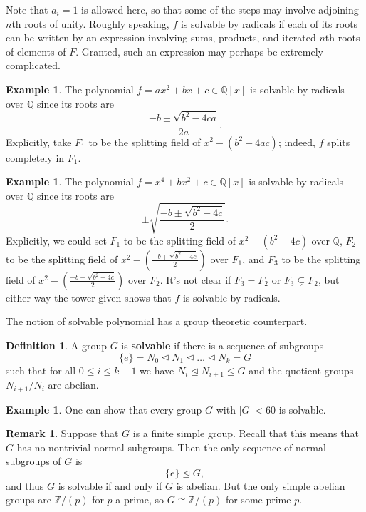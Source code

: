 \documentclass[12pt]{report}
\numberwithin{equation}{section}
\numberwithin{theorem}{chapter}
\theoremstyle{definition}
\newtheorem{definition}[theorem]{Definition}
\newtheorem{example}[theorem]{Example}
\newtheorem*{basic properties}{Basic Properties}
\newtheorem*{Important Remark}{Important Remark}
\newtheorem{remark}[theorem]{Remark}
\newcommand{\Z}{\mathbb{Z}}
\newcommand{\Q}{\mathbb{Q}}
\def\nsg{\unlhd}
\begin{document}
Note that $a_i = 1$ is allowed here, so that some of the steps may involve adjoining $n$th roots of unity. Roughly speaking, $f$ is solvable by radicals if each of its roots can be written by an expression involving sums, products, and iterated $n$th roots of elements of $F$. Granted, such an expression may perhaps be extremely complicated.

\begin{example}
	The polynomial $f = ax^2 + bx + c \in \Q[x]$ is solvable by radicals over $\Q$ since its roots are
	$$\frac{-b \pm \sqrt{b^2-4ca}}{2a}.$$
	Explicitly, take $F_1$ to be the splitting field of $x^2-(b^2-4ac)$; indeed, $f$ splits completely in $F_1$.
\end{example}


\begin{example} 
The polynomial $f = x^4 + bx^2 + c \in \Q[x]$ is solvable by radicals over $\Q$ since its roots are
$$\pm \sqrt{\frac{-b \pm \sqrt{b^2 - 4c}}{2}}.$$
Explicitly, we could set $F_1$ to be the splitting field of $x^2 - (b^2 - 4c)$ over $\Q$, $F_2$ to be the splitting field of $x^2 - \left(\frac{-b + \sqrt{b^2 - 4c}}{2}\right)$ over $F_1$, and $F_3$ to be the splitting field of $x^2 - \left(\frac{-b - \sqrt{b^2 - 4c}}{2}\right)$ over $F_2$. It's not clear if $F_3 = F_2$ or $F_3 \subsetneq F_2$, but either way the tower given shows that $f$ is solvable by radicals.	
\end{example}

The notion of solvable polynomial has a group theoretic counterpart.

\begin{definition}
A group $G$ is {\bf solvable} if there is a sequence of subgroups 
$$\{e\}=N_0 \nsg N_1 \nsg \ldots \nsg N_k = G$$ 
such that for all $0 \leqslant i \leqslant k-1$ we have $N_i \nsg N_{i+1} \leq G$ and the quotient groups $N_{i+1}/N_i$ are abelian.
\end{definition}


\begin{example}
	One can show that every group $G$ with $|G| < 60$ is solvable.
\end{example}

\begin{remark}\label{simple not solvable}
	Suppose that $G$ is a finite simple group. Recall that this means that $G$ has no nontrivial normal subgroups. Then the only sequence of normal subgroups of $G$ is
	$$\{ e \} \nsg G,$$
and thus $G$ is solvable if and only if $G$ is abelian. But the only simple abelian groups are $\Z/(p)$ for $p$ a prime, so $G \cong \Z/(p)$ for some prime $p$. 	
\end{remark}
\end{document}
